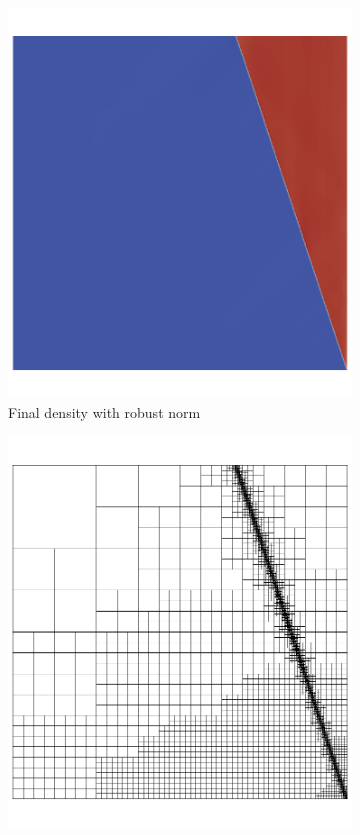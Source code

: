 \documentclass[Dissertation.tex]{subfiles}
\begin{document}
\begin{figure}[ht]
\centering
\begin{subfigure}[t]{0.45\textwidth}
\centering
\includegraphics[width=\textwidth]{Dissertation/Noh/Robust-den10.png}
\caption{Final density with robust norm}
\end{subfigure}
\begin{subfigure}[t]{0.45\textwidth}
\centering
\includegraphics[width=\textwidth]{Dissertation/Noh/Robust-meshonly10.png}

\end{subfigure}
\end{figure}
\end{document}
